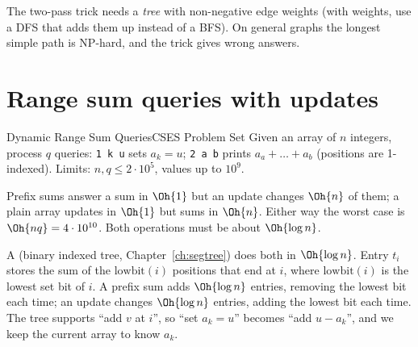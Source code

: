 \begin{pitfall}
The two-pass trick needs a \emph{tree} with non-negative edge weights (with weights, use a DFS that adds them up instead of a
BFS). On general graphs the longest simple path is NP-hard, and the trick gives wrong answers.
\end{pitfall}

\section[Range sum queries with updates]{Range sum queries with updates \hfill \gold}\label{wp:bit}

\begin{statement}{Dynamic Range Sum Queries}{CSES Problem Set}
Given an array of $n$ integers, process $q$ queries: \texttt{1 k u} sets $a_k = u$; \texttt{2 a b} prints
$a_a + \dots + a_b$ (positions are 1-indexed). Limits: $n, q \le 2\cdot 10^5$, values up to $10^9$.
\end{statement}

 Prefix sums answer a sum in $\Oh{1}$ but an update changes $\Oh{n}$ of them; a plain array updates
in $\Oh{1}$ but sums in $\Oh{n}$. Either way the worst case is $\Oh{nq} = 4\cdot10^{10}$. Both operations must be about
$\Oh{\log n}$.

 A  (binary indexed tree, Chapter~\ref{ch:segtree}) does both in $\Oh{\log n}$.
Entry $t_i$ stores the sum of the $\mathrm{lowbit}(i)$ positions that end at $i$, where $\mathrm{lowbit}(i)$ is the lowest
set bit of $i$. A prefix sum adds $\Oh{\log n}$ entries, removing the lowest bit each time; an update changes
$\Oh{\log n}$ entries, adding the lowest bit each time. The tree supports ``add $v$ at $i$'', so ``set $a_k = u$'' becomes
``add $u - a_k$'', and we keep the current array to know $a_k$.

